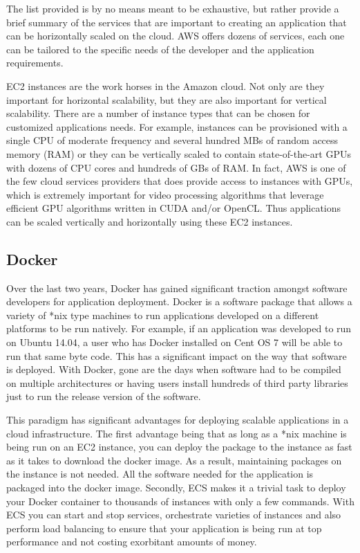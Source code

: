 The list provided is by no means meant to be exhaustive, but rather provide
a brief summary of the services that are important to creating an application
that can be horizontally scaled on the cloud. AWS offers dozens of services, each
one can be tailored to the specific needs of the developer and the application
requirements.

EC2 instances are the work horses in the Amazon cloud. Not only are they important
for horizontal scalability, but they are also important for vertical scalability.
There are a number of instance types that can be chosen for customized
applications needs. For example, instances can be provisioned with a single CPU
of moderate frequency and several hundred MBs of random access memory (RAM) or
they can be vertically scaled to contain state-of-the-art GPUs with dozens of
CPU cores and hundreds of GBs of RAM. In fact, AWS is one of the few cloud
services providers that does provide access to instances with GPUs, which is
extremely important for video processing algorithms that leverage efficient
GPU algorithms written in CUDA and/or OpenCL. Thus applications can be scaled
vertically and horizontally using these EC2 instances.

\subsection{\label{subsection:docker}Docker}
Over the last two years, Docker has gained significant traction amongst software
developers for application deployment. Docker is a software package that allows
a variety of *nix type machines to run applications developed on a different
platforms to be run natively. For example, if an application was developed to run
on Ubuntu 14.04, a user who has Docker installed on Cent OS 7 will be able to
run that same byte code. This has a significant impact on the way that software
is deployed. With Docker, gone are the days when software had to be compiled on
multiple architectures or having users install hundreds of third
party libraries just to run the release version of the software.

This paradigm has significant advantages for deploying scalable applications
in a cloud infrastructure. The first advantage being that as long as a *nix
machine is being run on an EC2 instance, you can deploy the package to the instance as
fast as it takes to download the docker image. As a result, maintaining packages
on the instance is not needed. All the software needed for the application
is packaged into the docker image. Secondly, ECS makes it a trivial task to deploy
your Docker container to thousands of instances with only a few commands. With
ECS you can start and stop services, orchestrate varieties of instances and
also perform load balancing to ensure that your application is being run at
top performance and not costing exorbitant amounts of money.
